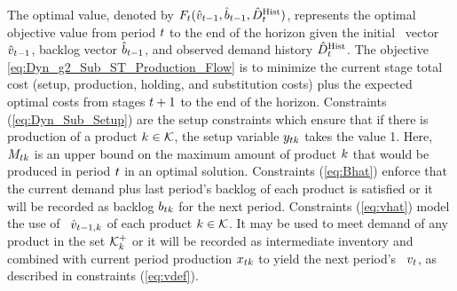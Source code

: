 \documentclass[msom]{oo}
\begin{document}


 The optimal value,  denoted by $F_t(\hat{v}_{t -1}, \hat{b}_{t -1}, \hat{D}^\text{Hist}_t)$, represents the optimal objective value from period $t$ to the end of the horizon given the initial \InvPos\ vector $\hat{v}_{t-1}$, backlog vector $\hat{b}_{t-1}$, and observed demand history $\hat{D}^{\text{Hist}}_t$. The objective \eqref{eq:Dyn_g2_Sub_ST_Production_Flow} is to minimize the current stage total cost (setup, production, holding, and substitution costs) plus the expected optimal costs from stages $t+1$ to the end of the horizon. 
Constraints (\ref{eq:Dyn_Sub_Setup}) are the setup constraints which ensure that if there is production of a product $k \in \mathcal{K}$, the setup variable $y_{t k}$  takes the value 1. Here,  $M_{t k}$ is an upper bound on the maximum amount of product $k$ that would be produced in period $t$ in an optimal solution.
Constraints (\ref{eq:Bhat}) enforce that the current demand plus last period's backlog of each product is satisfied or it will be recorded as backlog $b_{t k}$ for the next period.
Constraints (\ref{eq:vhat}) model the use of \InvPos\ $\hat{v}_{t-1, k}$ of each product $k \in \mathcal{K}$. It may be used to meet demand of any product in the set $\mathcal{K}^+_k$ or it will be recorded as intermediate inventory and combined with current period production $x_{t k}$ to yield the next period's \InvPos\ $v_{t}$, as described in 
constraints (\ref{eq:vdef}). 
\end{document}

